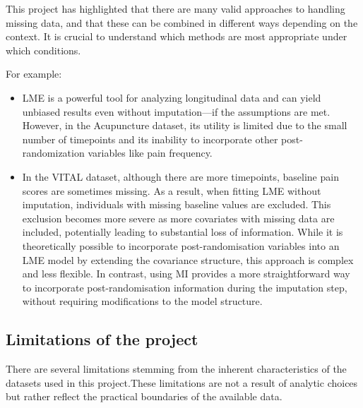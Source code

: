 \documentclass{article}
\begin{document}
This project has highlighted that there are many valid approaches to
handling missing data, and that these can be combined in different ways
depending on the context. It is crucial to understand which methods are
most appropriate under which conditions.

For example:

\begin{itemize}
\item
  LME is a powerful tool for analyzing longitudinal data and can yield
  unbiased results even without imputation---if the assumptions are met.
  However, in the Acupuncture dataset, its utility is limited due to the
  small number of timepoints and its inability to incorporate other
  post-randomization variables like pain frequency.
\item
  In the VITAL dataset, although there are more timepoints, baseline
  pain scores are sometimes missing. As a result, when fitting LME
  without imputation, individuals with missing baseline values are
  excluded. This exclusion becomes more severe as more covariates with
  missing data are included, potentially leading to substantial loss of
  information. While it is theoretically possible to incorporate
  post-randomisation variables into an LME model by extending the
  covariance structure, this approach is complex and less flexible. In
  contrast, using MI provides a more straightforward way to incorporate
  post-randomisation information during the imputation step, without
  requiring modifications to the model structure.
\end{itemize}

\subsection{Limitations of the
project}\label{limitations-of-the-project}

There are several limitations stemming from the inherent characteristics
of the datasets used in this project.These limitations are not a result
of analytic choices but rather reflect the practical boundaries of the
available data.
\end{document}
